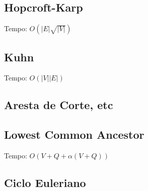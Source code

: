 \documentclass[12pt,a4paper]{article}
\begin{document}
			\subsection{Hopcroft-Karp}
				Tempo: \( O(|E| \sqrt{|V|})\)
				
			\subsection{Kuhn}
				Tempo: \( O(|V| |E|) \)
				
		\subsection{Aresta de Corte, etc}
			
		\subsection{Lowest Common Ancestor}
			Tempo: \( O(V + Q + \alpha(V + Q)) \)
			
		\subsection{Ciclo Euleriano}
			
\end{document}
